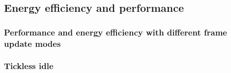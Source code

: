 \subsection{Energy efficiency and performance}

\subsubsection{Performance and energy efficiency with different frame update modes}

\subsubsection{Tickless idle}
